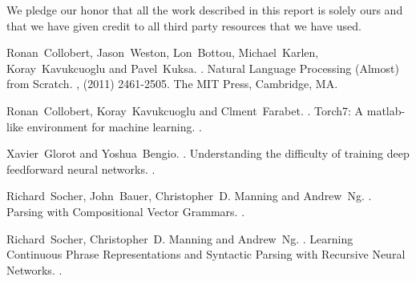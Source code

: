 \documentclass[11pt]{article}
\begin{document}
We pledge our honor that all the work described in this report is solely ours and
that we have given credit to all third party resources that we have used.

%
%

\begin{thebibliography}{}

Ronan~Collobert, Jason~Weston, Lon~Bottou, Michael~Karlen, Koray~Kavukcuoglu and Pavel~Kuksa.
.
\newblock Natural Language Processing (Almost) from Scratch.
,  (2011) 2461-2505.
\newblock The MIT Press, Cambridge, MA.

Ronan~Collobert, Koray~Kavukcuoglu and Clment~Farabet.
.
\newblock Torch7: A matlab-like environment for machine learning.
.

Xavier~Glorot and Yoshua~Bengio.
.
\newblock Understanding the difficulty of training deep feedforward neural networks.
.

Richard~Socher, John~Bauer, Christopher~D. Manning and Andrew~Ng.
.
\newblock Parsing with Compositional Vector Grammars.
.

Richard~Socher, Christopher~D. Manning and Andrew~Ng.
.
\newblock Learning Continuous Phrase Representations and
Syntactic Parsing with Recursive Neural Networks.
.

\end{thebibliography}
\end{document}
